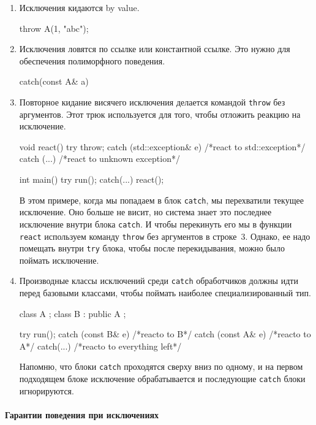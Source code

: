 \begin{enumerate}
\item Исключения кидаются by value.
\begin{cppcode}
throw A(1, "abc");
\end{cppcode}

\item Исключения ловятся по ссылке или константной ссылке.
Это нужно для обеспечения полиморфного поведения.
\begin{cppcode}
catch(const A& a)
\end{cppcode}

\item Повторное кидание висячего исключения делается командой \verb"throw" без аргументов.
Этот трюк используется для того, чтобы отложить реакцию на исключение.
\begin{cppcode}
void react() {
  try {
    throw;
  } catch (std::exception& e) {
    /*react to std::exception*/
  } catch (...) {
    /*react to unknown exception*/
  }
}

int main() {
  try {
    run();
  } catch(...) {
    react();
  }
}
\end{cppcode}
В этом примере, когда мы попадаем в блок \verb"catch", мы перехватили текущее исключение.
Оно больше не висит, но система знает это последнее исключение внутри блока \verb"catch".
И чтобы перекинуть его мы в функции \verb"react" используем команду \verb"throw" без аргументов в строке~3.
Однако, ее надо помещать внутри \verb"try" блока, чтобы после перекидывания, можно было поймать исключение.

\item Производные классы исключений среди \verb"catch" обработчиков должны идти перед базовыми классами, чтобы поймать наиболее специализированный тип.
\begin{cppcode}
class A {};
class B : public A {};

try {
  run();
} catch (const B& e) {
  /*reacto to B*/
} catch (const A& e) {
  /*reacto to A*/
} catch(...) {
  /*reacto to everything left*/
}
\end{cppcode}
Напомню, что блоки \verb"catch" проходятся сверху вниз по одному, и на первом подходящем блоке исключение обрабатывается и последующие \verb"catch" блоки игнорируются.

\end{enumerate}

\paragraph{Гарантии поведения при исключениях}

